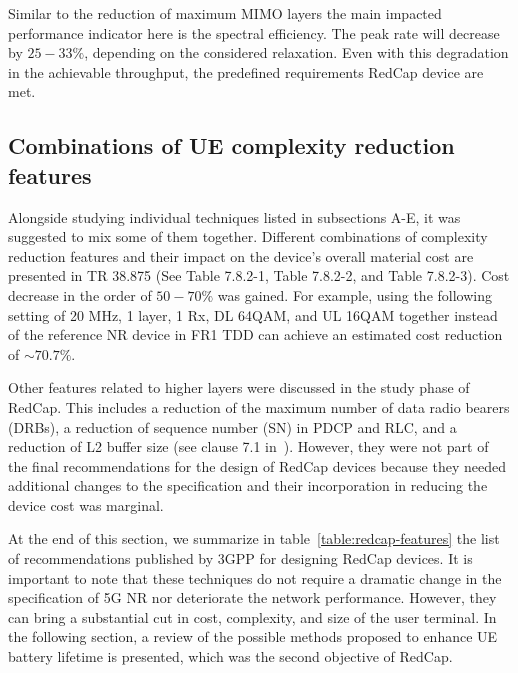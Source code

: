 \documentclass[]{IEEEtran}
\begin{document}
Similar to the reduction of maximum MIMO layers the main impacted performance indicator here is the spectral efficiency. The peak rate will decrease by $25-33\%$, depending on the considered relaxation. Even with this degradation in the achievable throughput, the predefined requirements RedCap device are met.  

\subsection{Combinations of UE complexity reduction features}
\label{sec:4-6}
Alongside studying individual techniques listed in subsections A-E, it was suggested to mix some of them together. Different combinations of complexity reduction features and their impact on the device's overall material cost are presented in TR 38.875 (See Table 7.8.2-1, Table 7.8.2-2, and Table 7.8.2-3). Cost decrease in the order of $50-70\%$ was gained. For example, using the following setting of 20 MHz, 1 layer, 1 Rx, DL 64QAM, and UL 16QAM together instead of the reference NR device in FR1 TDD can achieve an estimated cost reduction of $\sim70.7\%$.

Other features related to higher layers were discussed in the study phase of RedCap. This includes a reduction of the maximum number of data radio bearers (DRBs), a reduction of sequence number (SN) in PDCP and RLC, and a reduction of L2 buffer size (see clause 7.1 in~\cite{3gpp_study_2021_38.875}). However, they were not part of the final recommendations for the design of RedCap devices because they needed additional changes to the specification and their incorporation in reducing the device cost was marginal.

At the end of this section, we summarize in table~\ref{table:redcap-features} the list of recommendations published by 3GPP for designing RedCap devices. It is important to note that these techniques do not require a dramatic change in the specification of 5G NR nor deteriorate the network performance. However, they can bring a substantial cut in cost, complexity, and size of the user terminal. In the following section, a review of the possible methods proposed to enhance UE battery lifetime is presented, which was the second objective of RedCap.
\end{document}
